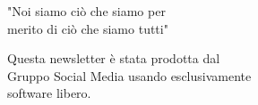 \documentclass[a4paper,twoside]{article}
\begin{document}
\begin{flushright}
"Noi siamo ciò che siamo per\\
merito di ciò che siamo tutti"
\end{flushright}

\clearpage
\thispagestyle{empty}
\begin{center}
Questa newsletter è stata prodotta dal\\
Gruppo Social Media usando esclusivamente\\
software libero.		
\end{center}
\end{document}
